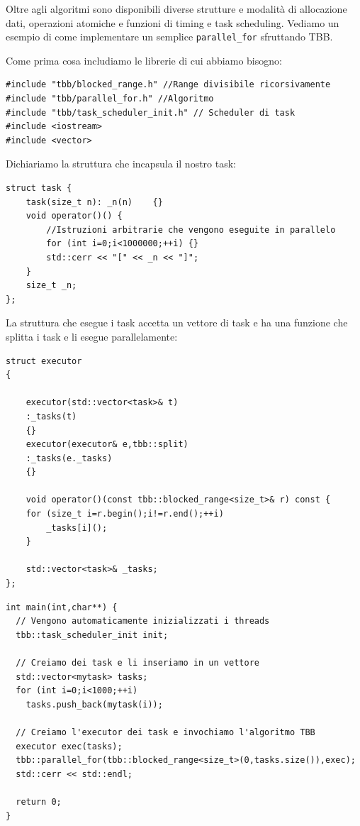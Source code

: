    Oltre agli algoritmi sono disponibili diverse strutture e modalità di allocazione dati, operazioni atomiche
    e funzioni di timing e task scheduling. Vediamo un esempio di come implementare un semplice \texttt{parallel\_for} sfruttando TBB.

    Come prima cosa includiamo le librerie di cui abbiamo bisogno:
    \begin{verbatim}
#include "tbb/blocked_range.h" //Range divisibile ricorsivamente
#include "tbb/parallel_for.h" //Algoritmo
#include "tbb/task_scheduler_init.h" // Scheduler di task
#include <iostream>
#include <vector>
    \end{verbatim}
    Dichiariamo la struttura che incapsula il nostro task:
    \begin{verbatim}
struct task {
    task(size_t n): _n(n)    {}
    void operator()() {
        //Istruzioni arbitrarie che vengono eseguite in parallelo
        for (int i=0;i<1000000;++i) {}
        std::cerr << "[" << _n << "]";
    }
    size_t _n;
};
    \end{verbatim}
    La struttura che esegue i task accetta un vettore di task e ha una funzione che splitta i task e li esegue parallelamente:
    \begin{verbatim}
struct executor
{

    executor(std::vector<task>& t)
    :_tasks(t)
    {}
    executor(executor& e,tbb::split)
    :_tasks(e._tasks)
    {}

    void operator()(const tbb::blocked_range<size_t>& r) const {
    for (size_t i=r.begin();i!=r.end();++i)
        _tasks[i]();
    }

    std::vector<task>& _tasks;
};
    \end{verbatim}
    \begin{verbatim}
int main(int,char**) {
  // Vengono automaticamente inizializzati i threads
  tbb::task_scheduler_init init;

  // Creiamo dei task e li inseriamo in un vettore
  std::vector<mytask> tasks;
  for (int i=0;i<1000;++i)
    tasks.push_back(mytask(i));

  // Creiamo l'executor dei task e invochiamo l'algoritmo TBB
  executor exec(tasks);
  tbb::parallel_for(tbb::blocked_range<size_t>(0,tasks.size()),exec);
  std::cerr << std::endl;

  return 0;
}
    \end{verbatim}

